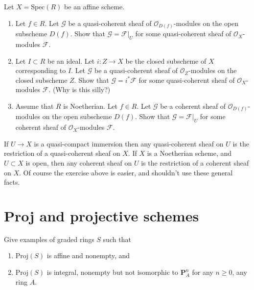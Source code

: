 \begin{exercise}
\label{exercise-extend-quasi-coherent}
Let $X = \text{Spec}(R)$ be an affine scheme.
\begin{enumerate}
\item Let $f \in R$. Let $\mathcal{G}$ be a
quasi-coherent sheaf of $\mathcal{O}_{D(f)}$-modules
on the open subscheme $D(f)$.
Show that $\mathcal{G} = \mathcal{F}|_U$ for some
quasi-coherent sheaf of $\mathcal{O}_X$-modules
$\mathcal{F}$.
\item Let $I \subset R$ be an ideal.
Let $i : Z \to X$ be the closed subscheme of $X$ corresponding
to $I$. Let $\mathcal{G}$ be a
quasi-coherent sheaf of $\mathcal{O}_Z$-modules
on the closed subscheme $Z$.
Show that $\mathcal{G} = i^*\mathcal{F}$ for some
quasi-coherent sheaf of $\mathcal{O}_X$-modules $\mathcal{F}$.
(Why is this silly?)
\item Assume that $R$ is Noetherian.
Let $f \in R$. Let $\mathcal{G}$ be a
coherent sheaf of $\mathcal{O}_{D(f)}$-modules
on the open subscheme $D(f)$.
Show that $\mathcal{G} = \mathcal{F}|_U$ for some
coherent sheaf of $\mathcal{O}_X$-modules $\mathcal{F}$.
\end{enumerate}
\end{exercise}

\begin{remark}
\label{remark-extend-off-open}
If $U \to X$ is a quasi-compact immersion then any
quasi-coherent sheaf on $U$ is the restriction of a
quasi-coherent sheaf on $X$.
If $X$ is a Noetherian scheme, and $U \subset X$ is open,
then any coherent sheaf on $U$ is the restriction of a
coherent sheaf on $X$.
Of course the exercise above is easier, and shouldn't use these general facts.
\end{remark}
















\section{Proj and projective schemes}
\label{section-proj}

\begin{exercise}
\label{exercise-graded-ring-specified-result}
Give examples of graded rings $S$ such that
\begin{enumerate}
\item $\text{Proj}(S)$ is affine and nonempty, and
\item $\text{Proj}(S)$ is integral, nonempty but not isomorphic
to ${\mathbf P}^n_A$ for any $n\geq 0$, any ring $A$.
\end{enumerate}
\end{exercise}

